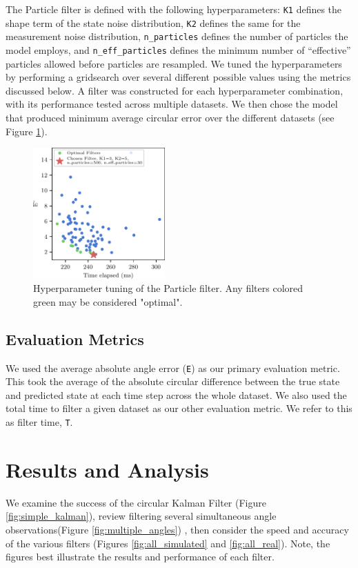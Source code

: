 \documentclass[11pt]{amsart}
\begin{document}
The Particle filter is defined with the following hyperparameters: \lstinline{K1} defines the shape term of the state noise distribution,  \lstinline{K2} defines the same for the measurement noise distribution, \lstinline{n_particles} defines the number of particles the model employs, and \lstinline{n_eff_particles} defines the minimum number of “effective” particles allowed before particles are resampled. We tuned the hyperparameters by performing a
gridsearch over several different possible values using the metrics discussed below. A filter was constructed for each hyperparameter
combination, with its performance tested across multiple datasets. We then chose the
model that produced minimum average circular error over the different datasets (see Figure \ref{fig:particle_hyperparam}).

\begin{figure}[htp]
    \centering
    \includegraphics[width=0.45\textwidth]{actual_paper_graphs/gridsearch_particle_filter.pdf}\hfill
    \caption{Hyperparameter tuning of the Particle filter. Any filters colored green may be considered "optimal".}
    \label{fig:particle_hyperparam}

\end{figure}

\subsection{Evaluation Metrics}
We used the average absolute angle error (\lstinline{E}) as our primary evaluation metric. This took the average of the absolute circular difference between the true state and predicted state at each time step across the whole dataset. We also used the total time to filter a given dataset as our other evaluation metric. We refer to this as filter time, \lstinline{T}.

\section{Results and Analysis}
We examine the success of the circular Kalman Filter (Figure \ref{fig:simple_kalman}), 
review filtering several simultaneous angle observations(Figure \ref{fig:multiple_angles})
, then consider the speed and accuracy of the various filters (Figures \ref{fig:all_simulated} and \ref{fig:all_real}).
Note, the figures best illustrate the results and performance of each filter.
\end{document}
